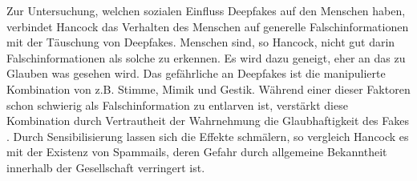 \par
Zur Untersuchung, welchen sozialen Einfluss Deepfakes auf den Menschen haben, verbindet Hancock das Verhalten des Menschen auf generelle Falschinformationen mit der Täuschung von Deepfakes.
Menschen sind, so Hancock, nicht gut darin Falschinformationen als solche zu erkennen.
Es wird dazu geneigt, eher an das zu Glauben was gesehen wird.
Das gefährliche an Deepfakes ist die manipulierte Kombination von z.B. Stimme, Mimik und Gestik.
Während einer dieser Faktoren schon schwierig als Falschinformation zu entlarven ist, verstärkt diese Kombination durch Vertrautheit der Wahrnehmung die Glaubhaftigkeit des Fakes \citep[Vgl.][]{Hancock2021}.
Durch Sensibilisierung lassen sich die Effekte schmälern, so vergleich Hancock es mit der Existenz von Spammails, deren Gefahr durch allgemeine Bekanntheit innerhalb der Gesellschaft verringert ist.